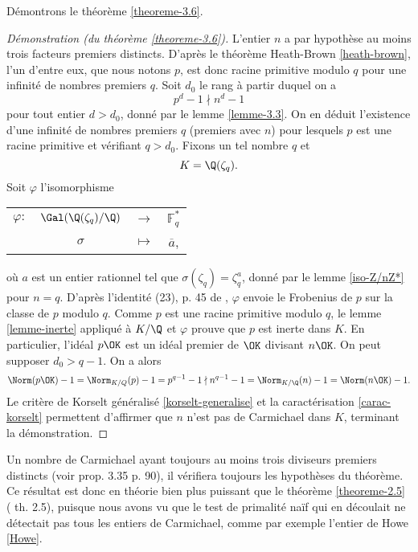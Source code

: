 Démontrons le théorème \ref{theoreme-3.6}.

\begin{proof}[Démonstration (du théorème \ref{theoreme-3.6})]
	L'entier $n$ a par hypothèse au moins trois facteurs premiers distincts. D'après le théorème Heath-Brown \ref{heath-brown}, l'un d'entre eux, que nous notons $p$, est donc racine primitive modulo $q$ pour une infinité de nombres premiers $q$. Soit $d_0$ le rang à partir duquel on a \[p^d - 1 \nmid n^d - 1\] pour tout entier $d>d_0$, donné par le lemme \ref{lemme-3.3}. On en déduit l'existence d'une infinité de nombres premiers $q$ (premiers avec $n$) pour lesquels $p$ est une racine primitive et vérifiant $q>d_0$. Fixons un tel nombre $q$ et \[K = \Q(\zeta_q).\] Soit $\varphi$ l'isomorphisme
\begin{center}
	\begin{tabular}{cccc}
		$\varphi :$ & $\Gal(\Q(\zeta_q)/\Q)$ & $\longrightarrow$ & $\mathbb{F}_q^*$ \\
		&$\sigma$	& $\longmapsto$ & $\overline{a}$,
	\end{tabular}
\end{center}
où $a$ est un entier rationnel tel que $\sigma(\zeta_q) = \zeta_q^a$, donné par le lemme \ref{iso-Z/nZ*} pour $n=q$. D'après l'identité (23), p. 45 de \cite{Kraus}, $\varphi$ envoie le Frobenius de $p$ sur la classe de $p$ modulo $q$. Comme $p$ est une racine primitive modulo $q$, le lemme \ref{lemme-inerte} appliqué à $K/\Q$ et $\varphi$ prouve que $p$ est inerte dans $K$. En particulier, l'idéal $p\OK$ est un idéal premier de $\OK$ divisant $n\OK$. On peut supposer $d_0 > q-1$. On a alors \[ \Norm(p\OK) - 1 = \Norm_{K/Q}(p) - 1 = p^{q-1} - 1 \nmid n^{q-1} - 1 = \Norm_{K/\Q}(n) - 1 = \Norm(n\OK) - 1.\] Le critère de Korselt généralisé \ref{korselt-generalise} et la caractérisation \ref{carac-korselt} permettent d'affirmer que $n$ n'est pas de Carmichael dans $K$, terminant la démonstration.

\end{proof}

Un nombre de Carmichael ayant toujours au moins trois diviseurs premiers distincts (voir \cite{Demazure} prop. 3.35 p. 90), il vérifiera toujours les hypothèses du théorème. Ce résultat est donc en théorie bien plus puissant que le théorème \ref{theoreme-2.5} (\cite{article} th. 2.5), puisque nous avons vu que le test de primalité naïf qui en découlait ne détectait pas tous les entiers de Carmichael, comme par exemple l'entier de Howe \ref{Howe}. 

